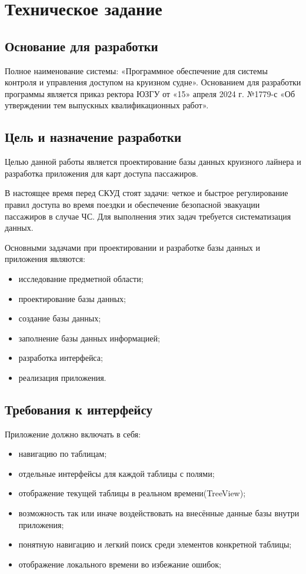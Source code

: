 \section{Техническое задание}
\subsection{Основание для разработки}

Полное наименование системы: «Программное обеспечение для системы контроля и управления доступом на круизном судне».
Основанием для разработки программы является приказ ректора ЮЗГУ от «15» апреля 2024 г. №1779-с «Об утверждении тем выпускных квалификационных работ».

\subsection{Цель и назначение разработки}

Целью данной работы является проектирование базы данных круизного лайнера и разработка приложения для карт доступа пассажиров.

В настоящее время перед СКУД стоят задачи: четкое и быстрое регулирование правил доступа во время поездки и обеспечение безопасной эвакуации пассажиров в случае ЧС. Для выполнения этих задач требуется систематизация данных. 

Основными задачами при проектировании и разработке базы данных  и приложения являются:
\begin{itemize}
	\item исследование предметной области;
	\item проектирование базы данных;
	\item создание базы данных;
	\item заполнение базы данных информацией;
	\item разработка  интерфейса;
	\item реализация приложения.
\end{itemize}

\subsection{Требования к интерфейсу}

Приложение должно включать в себя:
\begin{itemize}
	\item навигацию по таблицам;
	\item отдельные интерфейсы для каждой таблицы с полями;
	\item отображение текущей таблицы в реальном времени(TreeView);
	\item возможность так или иначе воздействовать на внесённые данные базы внутри приложения;
	\item понятную навигацию и легкий поиск среди элементов конкретной таблицы;
	\item отображение локального времени во избежание ошибок;
\end{itemize}

